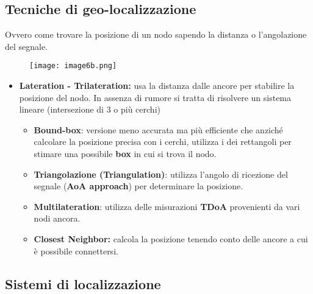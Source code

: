 \subsection{Tecniche di geo-localizzazione}
\label{tecniche-di-geo-localizzazione}

Ovvero come trovare la posizione di un nodo sapendo la distanza o
l'angolazione del segnale.

\begin{figure}[H]
 \centering
 \texttt{[image: image6b.png]}
\end{figure}

\begin{itemize}
\item \textbf{Lateration - Trilateration:} usa la distanza dalle ancore per
  stabilire la posizione del nodo. In assenza di rumore si tratta di
  risolvere un sistema lineare (intersezione di 3 o più cerchi)

  \begin{itemize}
  \item \textbf{Bound-box}: versione meno accurata ma più efficiente che
    anziché calcolare la posizione precisa con i cerchi, utilizza i dei
    rettangoli per stimare una possibile \textbf{box} in cui si trova il
    nodo.

  \item \textbf{Triangolazione (Triangulation)}: utilizza l'angolo di
    ricezione del segnale (\textbf{AoA approach}) per determinare la
    posizione.

  \item \textbf{Multilateration}: utilizza delle misurazioni \textbf{TDoA}
    provenienti da vari nodi ancora.

  \item \textbf{Closest Neighbor:} calcola la posizione tenendo conto delle
    ancore a cui è possibile connettersi.

  \end{itemize}
\end{itemize}

\subsection{Sistemi di localizzazione}
\label{sistemi-di-localizzazione}

